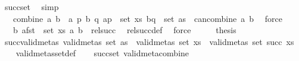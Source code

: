 \begin{isabellebody}
\ succ{\isacharunderscore}{\kern0pt}set\ \isamarkupfalse%
\ simp\isanewline
\ \ \isamarkupfalse%
\ \isamarkupfalse%
\ {\isachardoublequoteopen}{\isasymdots}\ {\isacharequal}{\kern0pt}\ {\isacharbraceleft}{\kern0pt}combine\ a\ b\ {\isacharbar}{\kern0pt}\ a\ p\ b\ q{\isachardot}{\kern0pt}\ {\isacharparenleft}{\kern0pt}a{\isacharcomma}{\kern0pt}p{\isacharparenright}{\kern0pt}\ {\isasymin}\ set\ xs\ {\isasymand}{\isacharparenleft}{\kern0pt}b{\isacharcomma}{\kern0pt}q{\isacharparenright}{\kern0pt}\ {\isasymin}\ set\ as\ {\isasymand}\ can{\isacharunderscore}{\kern0pt}combine\ a\ b{\isacharbraceright}{\kern0pt}{\isachardoublequoteclose}\ \isamarkupfalse%
\ force\isanewline
\ \ \isamarkupfalse%
\ \isamarkupfalse%
\ {\isachardoublequoteopen}{\isasymdots}\ {\isacharequal}{\kern0pt}\ {\isacharbraceleft}{\kern0pt}b{\isachardot}{\kern0pt}\ {\isasymexists}a{\isasymin}fst\ {\isacharbackquote}{\kern0pt}\ set\ xs{\isachardot}{\kern0pt}\ {\isacharparenleft}{\kern0pt}a{\isacharcomma}{\kern0pt}\ b{\isacharparenright}{\kern0pt}\ {\isasymin}\ rel{\isacharunderscore}{\kern0pt}succ{\isacharbraceright}{\kern0pt}{\isachardoublequoteclose}\ \isamarkupfalse%
\ rel{\isacharunderscore}{\kern0pt}succ{\isacharunderscore}{\kern0pt}def\ \isamarkupfalse%
\ force\isanewline
\ \ \isamarkupfalse%
\ \isamarkupfalse%
\ {\isacharquery}{\kern0pt}thesis\ \isacommand{{\isachardot}{\kern0pt}}\isamarkupfalse%
\isanewline
{}\isamarkupfalse%
%
\endisatagproof
{\isafoldproof}%
%
\isadelimproof
\isanewline
%
\endisadelimproof
\isanewline
{}\isamarkupfalse%
\ succ{\isacharunderscore}{\kern0pt}valid{\isacharunderscore}{\kern0pt}metas{\isacharcolon}{\kern0pt}\ {\isachardoublequoteopen}valid{\isacharunderscore}{\kern0pt}metas\ {\isacharparenleft}{\kern0pt}set\ as{\isacharparenright}{\kern0pt}\ {\isasymLongrightarrow}\ valid{\isacharunderscore}{\kern0pt}metas\ {\isacharparenleft}{\kern0pt}set\ xs{\isacharparenright}{\kern0pt}\ {\isasymLongrightarrow}\ valid{\isacharunderscore}{\kern0pt}metas\ {\isacharparenleft}{\kern0pt}set\ {\isacharparenleft}{\kern0pt}succ\ xs{\isacharparenright}{\kern0pt}{\isacharparenright}{\kern0pt}{\isachardoublequoteclose}\isanewline
%
\isadelimproof
\ \ %
\endisadelimproof
%
\isatagproof
{}\isamarkupfalse%
\ valid{\isacharunderscore}{\kern0pt}metas{\isacharunderscore}{\kern0pt}set{\isacharunderscore}{\kern0pt}def\isanewline
\ \ \isamarkupfalse%
\ succ{\isacharunderscore}{\kern0pt}set\ valid{\isacharunderscore}{\kern0pt}meta{\isacharunderscore}{\kern0pt}combine\ \isamarkupfalse%

\end{isabellebody}
